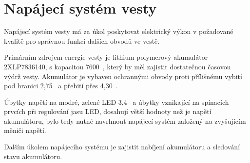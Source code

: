 \chapter{Napájecí systém vesty}
Napájecí systém vesty má za úkol poskytovat elektrický výkon v požadované kvalitě pro správnou funkci dalších obvodů ve vestě.

Primárním zdrojem energie vesty je lithium-polymerový akumulátor 2XLP7836140, s kapacitou 7600~, který by měl zajistit dostatečnou časovou výdrž vesty. Akumulátor je vybaven ochrannými obvody proti přílišnému vybití pod hranici 2,75~ a přebití přes 4,30~.

Úbytky napětí na modré, zelené LED 3,4~ a úbytky vznikající na spínacích prvcích při regulování jasu LED, dosahují větší hodnoty než je napětí akumulátoru, bylo tedy nutné navrhnout napájecí systém založený na zvyšujícím měniči napětí.

Dalším úkolem napájecího systému je zajistit nabíjení akumulátoru a sledování stavu akumulátoru.

